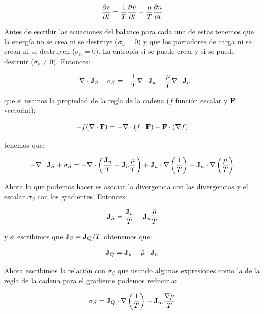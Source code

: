\documentclass[12pt]{book}
\begin{document}
\begin{equation}
\frac{\partial s}{\partial t} = \dfrac{1}{T} 
\frac{\partial u}{\partial t} - \dfrac{\bar{\mu}}{T} 
\frac{\partial n}{\partial t}
\end{equation} 

Antes de escribir las ecuaciones del balance para cada una de estas tenemos que la energía no se crea ni se destruye ($\sigma_u = 0$) y que los portadores de carga ni se crean ni se destruyen ($\sigma_n = 0$). La entropía si se puede crear y si se puede destruir ($\sigma_s \neq 0$). Entonces:

\begin{equation}
- \nabla \cdot \textbf{J}_S + \sigma_S = - \dfrac{1}{T} \nabla \cdot  \textbf{J}_u - \dfrac{\bar{\mu}}{T} \nabla \cdot \textbf{J}_n
\end{equation}

que si usamos la propiedad de la regla de la cadena ($f$ función escalar y $\textbf{F}$ vectorial):

$$ - f (\nabla \cdot \textbf{F}) = - \nabla \cdot (f  \cdot \textbf{F}) + \textbf{F} \cdot ( \nabla f ) $$

tenemos que:

\begin{equation}
- \nabla \cdot \textbf{J}_S + \sigma_S = -  \nabla \cdot  \left( \dfrac{\textbf{J}_u}{T} - \textbf{J}_n \dfrac{\bar{\mu}}{T}  \right) + \textbf{J}_u \cdot \nabla \left( \dfrac{1}{T} \right) + \textbf{J}_n \cdot \nabla \left( \dfrac{\bar{\mu}}{T} \right)
\end{equation}

Ahora lo que podemos hacer es asociar la divergencia con las divergencias y el escalar $\sigma_S$ con los gradientes. Entonces:

\begin{equation}
\textbf{J}_S = \dfrac{\textbf{J}_u}{T} - \textbf{J}_n \dfrac{\bar{\mu}}{T}
\end{equation}

y si escribimos que $\textbf{J}_S = \textbf{J}_Q / T$ obtenemos que:


\begin{equation}
\textbf{J}_ Q = \textbf{J}_u- \bar{\mu} \cdot \textbf{J}_n 
\end{equation}

Ahora escribimos la relación con $\sigma_S$ que usando algunas expresiones como la de la regla de la cadena para el gradiente podemos reducir a:

\begin{equation}
\sigma_S = \textbf{J}_Q \cdot \nabla \left( \dfrac{1}{T} \right) - \textbf{J}_m \dfrac{\nabla \bar{\mu}}{T}
\end{equation}
\end{document}
